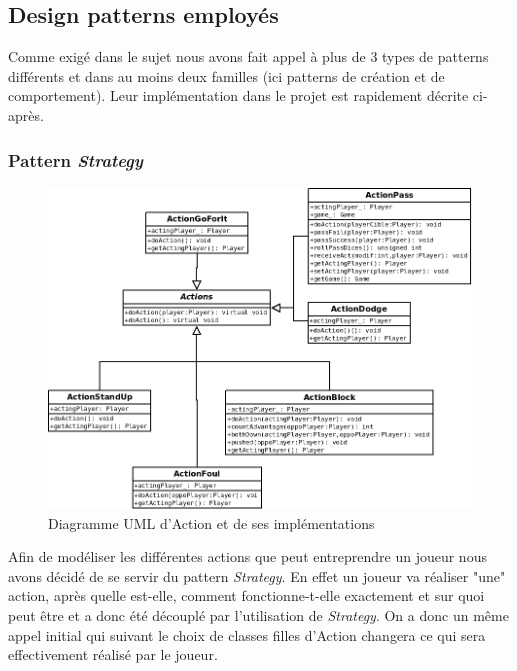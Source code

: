 \documentclass{article}
\newcommand{\pattern}{\emph}
\begin{document}
    \subsection{Design patterns employés}
        
        Comme exigé dans le sujet nous avons fait appel à plus de 3 types de patterns différents et dans au moins deux familles (ici patterns de création et de comportement). Leur implémentation dans le projet est rapidement décrite ci-après.
        
        \subsubsection{Pattern \pattern{Strategy}}
            
            \begin{figure}[H]
                \centerline{\includegraphics[scale=0.5]{img/Actions.png}}
                \caption{\label{DiaActions} Diagramme UML d'Action et de ses implémentations}
            \end{figure}
        
            Afin de modéliser les différentes actions que peut entreprendre un joueur nous avons décidé de se servir du pattern \pattern{Strategy}. En effet un joueur va réaliser "une" action, après quelle est-elle, comment fonctionne-t-elle exactement et sur quoi peut être et a donc été découplé par  l'utilisation de \pattern{Strategy}. On a donc un même appel initial qui suivant le choix de classes filles d'Action changera ce qui sera effectivement réalisé par le joueur.
        
\end{document}
